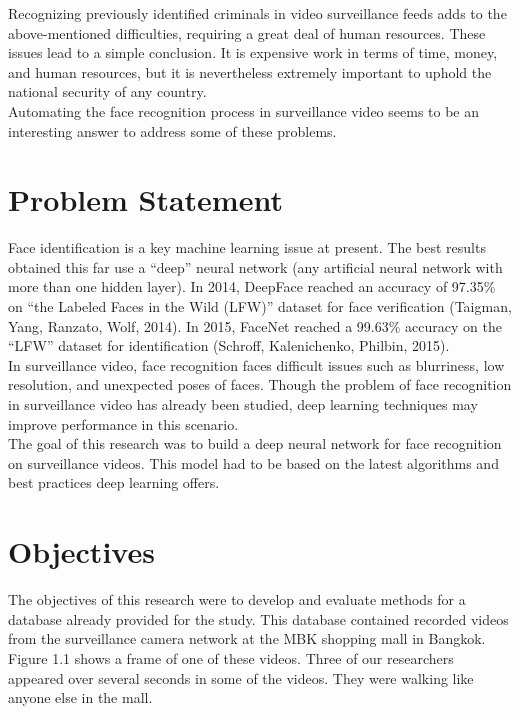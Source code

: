 Recognizing previously identified criminals in video surveillance feeds adds to the above-mentioned difficulties, requiring a great deal of human resources. These issues lead to a simple conclusion.  It is expensive work in terms of time, money, and human resources, but it is nevertheless extremely important to uphold the national security of any country.\\

Automating the face recognition process in surveillance video seems to be an interesting answer to address some of these problems.\\


\section{Problem Statement}

 Face identification is a key machine learning issue at present. The best results obtained this far use a \enquote{deep} neural network (any artificial neural network with more than one hidden layer). In 2014, DeepFace reached an accuracy of 97.35\% on \enquote{the Labeled Faces in the Wild (LFW)} dataset for face verification (Taigman, Yang, Ranzato, Wolf, 2014). In 2015, FaceNet reached a 99.63\% accuracy on the \enquote{LFW} dataset for identification (Schroff, Kalenichenko, Philbin, 2015).\\


In surveillance video, face recognition faces difficult issues such as blurriness, low resolution, and unexpected poses of faces. Though the problem of face recognition in surveillance video has already been studied, deep learning techniques may improve performance in this scenario.\\

The goal of this research was to build a deep neural network for face recognition on surveillance videos. This model had to be based on the latest algorithms and best practices deep learning offers.

\section{Objectives}

The objectives of this research were to develop and evaluate methods for a database already provided for the study. This database contained recorded videos from the surveillance camera network at the MBK shopping mall in Bangkok. Figure 1.1 shows a frame of one of these videos. Three of our researchers appeared over several seconds in some of the videos. They were walking like anyone else in the mall.\\


